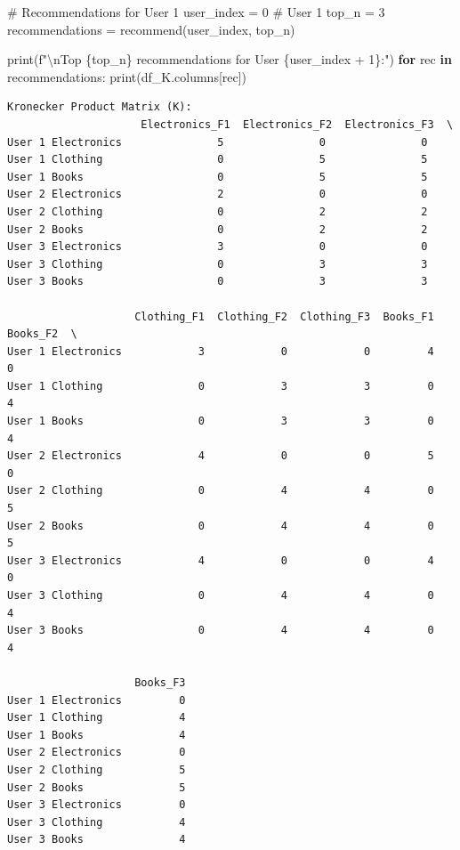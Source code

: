 \documentclass[
  letterpaper,
  DIV=11,
  numbers=noendperiod]{scrreprt}
\newenvironment{Shaded}{\begin{snugshade}}{\end{snugshade}}
\newcommand{\BuiltInTok}[1]{\textcolor[rgb]{0.00,0.23,0.31}{#1}}
\newcommand{\CharTok}[1]{\textcolor[rgb]{0.13,0.47,0.30}{#1}}
\newcommand{\CommentTok}[1]{\textcolor[rgb]{0.37,0.37,0.37}{#1}}
\newcommand{\ControlFlowTok}[1]{\textcolor[rgb]{0.00,0.23,0.31}{\textbf{#1}}}
\newcommand{\DecValTok}[1]{\textcolor[rgb]{0.68,0.00,0.00}{#1}}
\newcommand{\KeywordTok}[1]{\textcolor[rgb]{0.00,0.23,0.31}{\textbf{#1}}}
\newcommand{\NormalTok}[1]{\textcolor[rgb]{0.00,0.23,0.31}{#1}}
\newcommand{\OperatorTok}[1]{\textcolor[rgb]{0.37,0.37,0.37}{#1}}
\newcommand{\SpecialCharTok}[1]{\textcolor[rgb]{0.37,0.37,0.37}{#1}}
\newcommand{\SpecialStringTok}[1]{\textcolor[rgb]{0.13,0.47,0.30}{#1}}
\theoremstyle{plain}
\theoremstyle{definition}
\theoremstyle{remark}
\begin{document}
\begin{tcolorbox}
\begin{Shaded}
\begin{Highlighting}[]
\CommentTok{\# Recommendations for User 1}
\NormalTok{user\_index }\OperatorTok{=} \DecValTok{0}  \CommentTok{\# User 1}
\NormalTok{top\_n }\OperatorTok{=} \DecValTok{3}
\NormalTok{recommendations }\OperatorTok{=}\NormalTok{ recommend(user\_index, top\_n)}

\BuiltInTok{print}\NormalTok{(}\SpecialStringTok{f"}\CharTok{\textbackslash{}n}\SpecialStringTok{Top }\SpecialCharTok{\{}\NormalTok{top\_n}\SpecialCharTok{\}}\SpecialStringTok{ recommendations for User }\SpecialCharTok{\{}\NormalTok{user\_index }\OperatorTok{+} \DecValTok{1}\SpecialCharTok{\}}\SpecialStringTok{:"}\NormalTok{)}
\ControlFlowTok{for}\NormalTok{ rec }\KeywordTok{in}\NormalTok{ recommendations:}
    \BuiltInTok{print}\NormalTok{(df\_K.columns[rec])}
\end{Highlighting}
\end{Shaded}

\begin{verbatim}
Kronecker Product Matrix (K):
                     Electronics_F1  Electronics_F2  Electronics_F3  \
User 1 Electronics               5               0               0   
User 1 Clothing                  0               5               5   
User 1 Books                     0               5               5   
User 2 Electronics               2               0               0   
User 2 Clothing                  0               2               2   
User 2 Books                     0               2               2   
User 3 Electronics               3               0               0   
User 3 Clothing                  0               3               3   
User 3 Books                     0               3               3   

                    Clothing_F1  Clothing_F2  Clothing_F3  Books_F1  Books_F2  \
User 1 Electronics            3            0            0         4         0   
User 1 Clothing               0            3            3         0         4   
User 1 Books                  0            3            3         0         4   
User 2 Electronics            4            0            0         5         0   
User 2 Clothing               0            4            4         0         5   
User 2 Books                  0            4            4         0         5   
User 3 Electronics            4            0            0         4         0   
User 3 Clothing               0            4            4         0         4   
User 3 Books                  0            4            4         0         4   

                    Books_F3  
User 1 Electronics         0  
User 1 Clothing            4  
User 1 Books               4  
User 2 Electronics         0  
User 2 Clothing            5  
User 2 Books               5  
User 3 Electronics         0  
User 3 Clothing            4  
User 3 Books               4  


\end{verbatim}
\end{tcolorbox}
\end{document}
